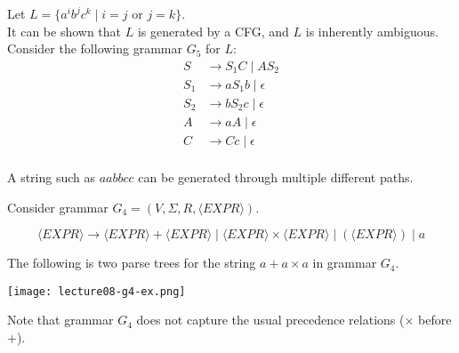 \documentclass[11pt,a4paper]{article}
\begin{document}
\begin{example}
    Let $L=\{a^ib^jc^k\mid i=j\text{ or }j=k\}$. \\

    It can be shown that $L$ is generated by a CFG, and $L$ is inherently ambiguous. Consider the following grammar $G_5$ for $L$:
    \begin{align*}
        S & \rightarrow S_1C\mid AS_2 \\
        S_1 & \rightarrow aS_1b\mid\epsilon \\
        S_2 & \rightarrow bS_2c\mid\epsilon \\
        A & \rightarrow aA\mid\epsilon \\
        C & \rightarrow Cc\mid\epsilon \\
    \end{align*}

    A string such as $aabbcc$ can be generated through multiple different paths.
\end{example}

\begin{example}
    Consider grammar $G_4=(V,\Sigma,R,\langle EXPR\rangle)$.

    $$\langle EXPR\rangle\rightarrow \langle EXPR\rangle+\langle EXPR\rangle\mid\langle EXPR\rangle\times\langle EXPR\rangle\mid (\langle EXPR\rangle)\mid a$$

    The following is two parse trees for the string $a+a\times a$ in grammar $G_4$.

    \texttt{[image: lecture08-g4-ex.png]}

    Note that grammar $G_4$ does not capture the usual precedence relations ($\times$ before +).
\end{example}


\end{document}
